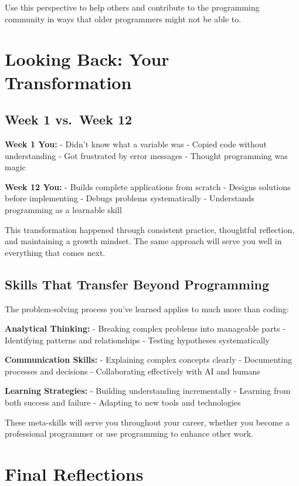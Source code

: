 \documentclass[
  letterpaper,
  DIV=11,
  numbers=noendperiod,
  oneside]{scrreprt}
\begin{document}
Use this perspective to help others and contribute to the programming
community in ways that older programmers might not be able to.

\section{Looking Back: Your
Transformation}\label{looking-back-your-transformation}

\subsection{Week 1 vs.~Week 12}\label{week-1-vs.-week-12}

\textbf{Week 1 You:} - Didn't know what a variable was - Copied code
without understanding - Got frustrated by error messages - Thought
programming was magic

\textbf{Week 12 You:} - Builds complete applications from scratch -
Designs solutions before implementing - Debugs problems systematically -
Understands programming as a learnable skill

This transformation happened through consistent practice, thoughtful
reflection, and maintaining a growth mindset. The same approach will
serve you well in everything that comes next.

\subsection{Skills That Transfer Beyond
Programming}\label{skills-that-transfer-beyond-programming}

The problem-solving process you've learned applies to much more than
coding:

\textbf{Analytical Thinking:} - Breaking complex problems into
manageable parts - Identifying patterns and relationships - Testing
hypotheses systematically

\textbf{Communication Skills:} - Explaining complex concepts clearly -
Documenting processes and decisions - Collaborating effectively with AI
and humans

\textbf{Learning Strategies:} - Building understanding incrementally -
Learning from both success and failure - Adapting to new tools and
technologies

These meta-skills will serve you throughout your career, whether you
become a professional programmer or use programming to enhance other
work.

\section{Final Reflections}\label{final-reflections}
\end{document}
